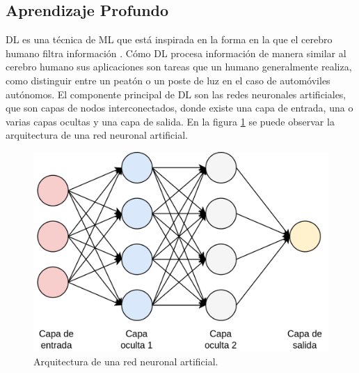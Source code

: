 \subsection{Aprendizaje Profundo}
DL es una técnica de ML  que está inspirada en la forma en la que el cerebro humano filtra información \cite{dl_def}. Cómo DL procesa información de manera similar al cerebro humano sus aplicaciones son tareas que un humano generalmente realiza, como distinguir entre un peatón o un poste de luz en el caso de automóviles autónomos. El componente principal de DL son las redes neuronales artificiales, que son capas de nodos interconectados, donde existe una capa de entrada, una o varias capas ocultas y una capa de salida. En la figura \ref{fig:dl_nn} se puede observar la arquitectura de una red neuronal artificial.
\begin{figure}[h]
	\centering
	\includegraphics[scale=0.25]{./Figures/dl_nn.png}
	\caption{Arquitectura de una red neuronal artificial.}
	\label{fig:dl_nn}
\end{figure}

